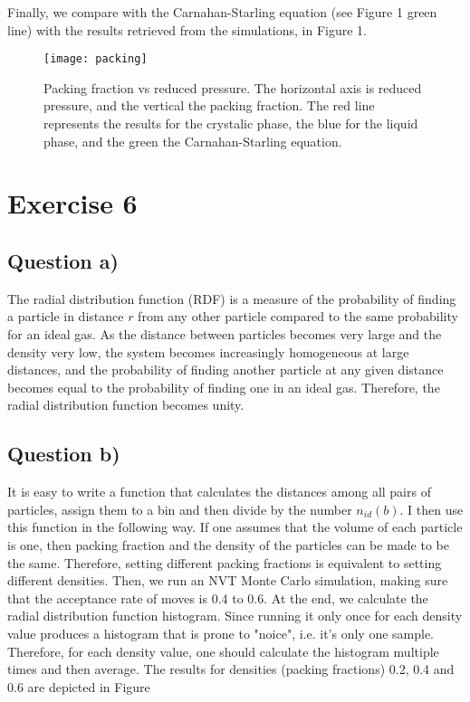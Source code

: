 \documentclass[11pt]{report}
\begin{document}
Finally, we compare with the Carnahan-Starling equation (see Figure 1 green line) with the results retrieved from the simulations, in Figure 1.

\begin{figure*}[ht!]
	\begin{center}
		\texttt{[image: packing]}
		\caption{Packing fraction vs reduced pressure. The horizontal axis is reduced pressure, and the vertical the packing fraction. The red line represents the results for the crystalic phase, the blue for the liquid phase, and the green the Carnahan-Starling equation.}
	\end{center}
\end{figure*}




\section*{Exercise 6}

\subsection*{Question a)}

The radial distribution function (RDF) is a measure of the probability of finding a particle in distance $r$ from any other particle compared to the same probability for an ideal gas. As the distance between particles becomes very large and the density very low, the system becomes increasingly homogeneous at large distances, and the probability of finding another particle at any given distance becomes equal to the probability of finding one in an ideal gas. Therefore, the radial distribution function becomes unity.

\subsection*{Question b)}

It is easy to write a function that calculates the distances among all pairs of particles, assign them to a bin and then divide by the number $n_{id}(b)$. I then use this function in the following way. If one assumes that the volume of each particle is one, then packing fraction and the density of the particles can be made to be the same. Therefore, setting different packing fractions is equivalent to setting different densities. Then, we run an NVT Monte Carlo simulation, making sure that the acceptance rate of moves is 0.4 to 0.6. At the end,  we calculate the radial distribution function histogram. Since running it only once for each density value produces a histogram that is prone to "noice", i.e. it's only one sample. Therefore, for each density value, one should calculate the histogram multiple times and then average. The results for densities (packing fractions) 0.2, 0.4 and 0.6 are depicted in Figure %
\end{document}
